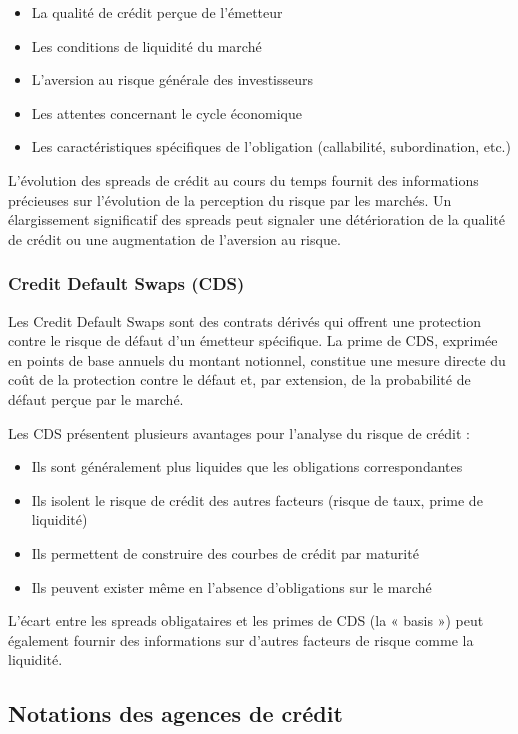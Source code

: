 \begin{itemize}
    \item La qualité de crédit perçue de l'émetteur
    \item Les conditions de liquidité du marché
    \item L'aversion au risque générale des investisseurs
    \item Les attentes concernant le cycle économique
    \item Les caractéristiques spécifiques de l'obligation (callabilité, subordination, etc.)
\end{itemize}

L'évolution des spreads de crédit au cours du temps fournit des informations précieuses sur l'évolution de la perception du risque par les marchés. Un élargissement significatif des spreads peut signaler une détérioration de la qualité de crédit ou une augmentation de l'aversion au risque.

\subsubsection{Credit Default Swaps (CDS)}

Les Credit Default Swaps sont des contrats dérivés qui offrent une protection contre le risque de défaut d'un émetteur spécifique. La prime de CDS, exprimée en points de base annuels du montant notionnel, constitue une mesure directe du coût de la protection contre le défaut et, par extension, de la probabilité de défaut perçue par le marché.

Les CDS présentent plusieurs avantages pour l'analyse du risque de crédit :

\begin{itemize}
    \item Ils sont généralement plus liquides que les obligations correspondantes
    \item Ils isolent le risque de crédit des autres facteurs (risque de taux, prime de liquidité)
    \item Ils permettent de construire des courbes de crédit par maturité
    \item Ils peuvent exister même en l'absence d'obligations sur le marché
\end{itemize}

L'écart entre les spreads obligataires et les primes de CDS (la « basis ») peut également fournir des informations sur d'autres facteurs de risque comme la liquidité.

\subsection{Notations des agences de crédit}

